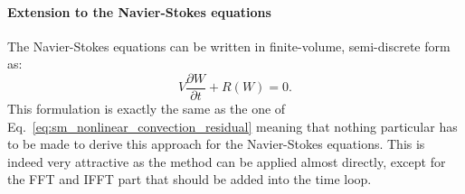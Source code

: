 \paragraph{Extension to the Navier-Stokes equations}
The Navier-Stokes equations can be written in finite-volume,
semi-discrete form as:
\begin{equation}
	V \frac{\partial W}{\partial t} + R(W) = 0.
	\label{eq:navier_stokes_fv_sd}
\end{equation}
This formulation is exactly the same as the one of 
Eq.~\ref{eq:sm_nonlinear_convection_residual} meaning that
nothing particular has to be made to derive this approach for
the Navier-Stokes equations. This is indeed very attractive as the
method can be applied almost directly, except for the FFT and IFFT
part that should be added into the time loop.


